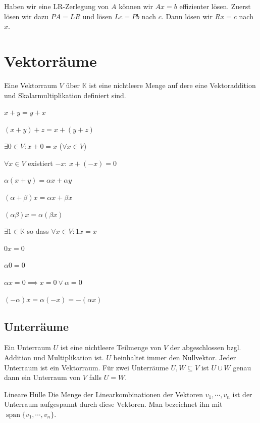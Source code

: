 \documentclass[a4paper,10pt]{article}
\DeclareMathOperator{\Span}{span}
\def\K{\mathbb{K}}
\begin{document}
Haben wir eine LR-Zerlegung von $A$ können wir $Ax = b$ effizienter lösen. Zuerst lösen wir dazu $PA = LR$ und lösen $Lc = Pb$ nach $c$. Dann lösen wir $Rx = c$ nach $x$.

\section{Vektorräume}

\begin{mainbox}{}
  Eine Vektorraum $V$ über $\K$ ist eine nichtleere Menge auf dere eine Vektoraddition und Skalarmultiplikation definiert sind.
  \begin{vaxioms}
    \item $x + y = y + x$
    \item $(x + y) + z = x + (y + z)$
    \item $\exists 0 \in V: x + 0 = x$ ($\forall x \in V$)
    \item $\forall x \in V$ existiert $-x$: $x + (-x) = 0$
    \item $\alpha(x + y) = \alpha x + \alpha y$
    \item $(\alpha + \beta)x = \alpha x + \beta x$
    \item $(\alpha \beta)x = \alpha (\beta x)$
    \item $\exists 1 \in \K$ so dass $\forall x \in V: 1x = x$
  \end{vaxioms}
\end{mainbox}

\begin{rowlist}
  \item $0x = 0$
  \item $\alpha 0 = 0$
  \item $\alpha x = 0 \implies x = 0 \vee \alpha = 0$
  \item $(-\alpha)x = \alpha (-x) = -(\alpha x)$
\end{rowlist}

\subsection{Unterräume}

Ein Unterraum $U$ ist eine nichtleere Teilmenge von $V$ der abgeschlossen bzgl. Addition und Multiplikation ist. $U$ beinhaltet immer den Nullvektor. Jeder Unterraum ist ein Vektorraum. Für zwei Unterräume $U, W \subseteq V$ ist $U \cup W$ genau dann ein Unterraum von $V$ falls $U = W$. 

\begin{subbox}{Lineare Hülle}
  Die Menge der Linearkombinationen der Vektoren $v_1, \cdots, v_n$ ist der Unterraum aufgespannt durch diese Vektoren. Man bezeichnet ihn mit $\Span \{ v_1, \cdots, v_n \}$.
\end{subbox}
\end{document}
